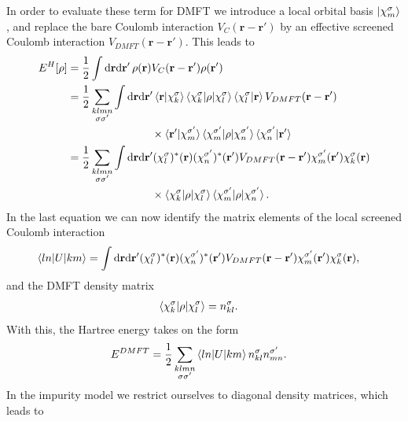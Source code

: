 \documentclass[12pt,a4paper]{scrartcl}
\numberwithin{equation}{section}
\renewcommand{\vec}{\mathbf}
\begin{document}
In order to evaluate these term for DMFT we introduce a local orbital basis  $\ket{\chi^{\sigma}_m}$, 
and replace the bare Coulomb interaction $V_C(\vec{r}-\vec{r}')$ 
by an effective screened Coulomb interaction $V_{DMFT}(\vec{r}-\vec{r}')$.
This leads to 
\begin{align}
E^H[\rho]
%
&= \frac{1}{2}\int \mathrm{d}\vec{r}\mathrm{d}\vec{r}' \, 
\rho(\vec{r}) V_C(\vec{r}-\vec{r}') \rho(\vec{r}') \\
%
&= \frac{1}{2}\sum_{\substack{klmn\\\sigma\sigma'}}\int \mathrm{d}\vec{r}\mathrm{d}\vec{r}' 
\braket{\vec{r}|\chi^{\sigma}_k}  \braket{\chi^{\sigma}_k|\rho|\chi^{\sigma}_l}  
\braket{\chi^{\sigma}_l | \vec{r}}V_{DMFT}(\vec{r}-\vec{r}') \nonumber \\
& \hspace{2.7cm} \times 
\braket{\vec{r}'|\chi^{\sigma'}_m}  \braket{\chi^{\sigma'}_m|\rho|\chi^{\sigma'}_n}  
\braket{\chi^{\sigma'}_n | \vec{r}'} \\
%
&= \frac{1}{2}\sum_{\substack{klmn\\\sigma\sigma'}}\int \mathrm{d}\vec{r}\mathrm{d}\vec{r}' 
 (\chi^{\sigma}_l)^*(\vec{r}) (\chi^{\sigma'}_n)^*(\vec{r}')
    V_{DMFT}(\vec{r}-\vec{r}') 
  \chi^{\sigma'}_m(\vec{r}')  \chi^{\sigma}_k(\vec{r}) \nonumber \\
& \hspace{2.7cm} \times 
\braket{\chi^{\sigma}_k|\rho|\chi^{\sigma}_l} 
\braket{\chi^{\sigma'}_m|\rho|\chi^{\sigma'}_n}  .
\end{align}
%
In the last equation we can now identify the matrix elements of the local screened Coulomb
interaction
\begin{align}
\braket{ln|U|km}
&=
\int \mathrm{d}\vec{r}\mathrm{d}\vec{r}' 
 (\chi^{\sigma}_l)^*(\vec{r}) (\chi^{\sigma'}_n)^*(\vec{r}')
    V_{DMFT}(\vec{r}-\vec{r}') 
  \chi^{\sigma'}_m(\vec{r}')  \chi^{\sigma}_k(\vec{r}) ,
\end{align}
and the DMFT density matrix
\begin{align}
\braket{\chi^{\sigma}_k|\rho|\chi^{\sigma}_l} 
&= n^{\sigma}_{kl}.
\end{align}
With this, the Hartree energy takes on the form
\begin{align}
E^{DMFT}
&= \frac{1}{2}\sum_{\substack{klmn\\\sigma\sigma'}}
\braket{ln|U|km}
n^{\sigma}_{kl} n^{\sigma'}_{mn}.
\end{align}
In the impurity model we restrict ourselves to diagonal density matrices, which leads to
\end{document}
